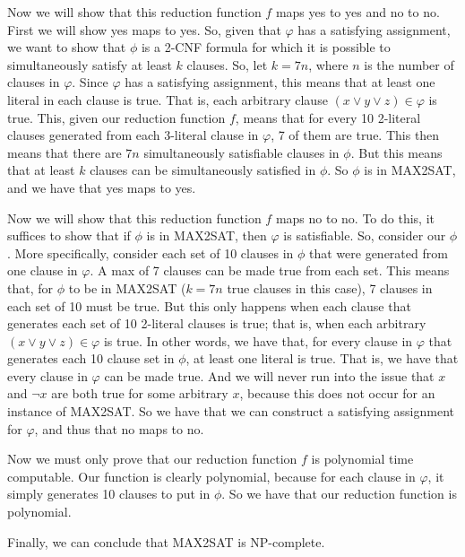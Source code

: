 \documentclass{article}
\begin{document}
Now we will show that this reduction function $f$ maps yes to yes and no to no.
First we will show yes maps to yes. So, given that $\varphi$ has a satisfying
assignment, we want to show that $\phi$ is a 2-CNF formula for which it is
possible to simultaneously satisfy at least $k$ clauses. So, let $k = 7n$,
where $n$ is the number of clauses in $\varphi$. Since $\varphi$ has a
satisfying assignment, this means that at least one literal in each clause
is true. That is, each arbitrary clause $(x \vee y \vee z) \in \varphi$ is true.
This, given our
reduction function $f$, means that for every 10 2-literal clauses generated
from each 3-literal clause in $\varphi$, 7 of them are true. This then means
that there are $7n$ simultaneously satisfiable clauses in $\phi$. But this
means that at least $k$ clauses can be simultaneously satisfied in $\phi$. So
$\phi$ is in MAX2SAT, and we have that yes maps to yes.

Now we will show that this reduction function $f$ maps no to no. To do this,
it suffices to show that if $\phi$ is in MAX2SAT, then $\varphi$ is satisfiable.
So, consider our $\phi$. More specifically, consider each set of 10 clauses
in $\phi$ that were generated from one clause in $\varphi$. A max of 7 clauses
can be made true from each set. This means that, for $\phi$ to be in MAX2SAT
($k = 7n$ true clauses in this case), 7 clauses in each set of 10 must be true.
But this only happens when each clause that generates each set of 10 2-literal
clauses is true; that is, when each arbitrary $(x \vee y \vee z) \in \varphi$
is true.  In other words, we have that, for every clause in $\varphi$ that
generates each 10 clause set in $\phi$, at least one literal is true. That is,
we have that every clause in $\varphi$ can be made true. And we will never
run into the issue that $x$ and $\neg x$ are both true for some arbitrary $x$,
because this does not occur for an instance of MAX2SAT. So we have that
we can construct a satisfying assignment for $\varphi$, and thus that no maps
to no.

Now we must only prove that our reduction function $f$ is polynomial time
computable. Our function is clearly polynomial, because for each clause
in $\varphi$, it simply generates 10 clauses to put in $\phi$. So we have
that our reduction function is polynomial.

Finally, we can conclude that MAX2SAT is NP-complete.
\end{document}
